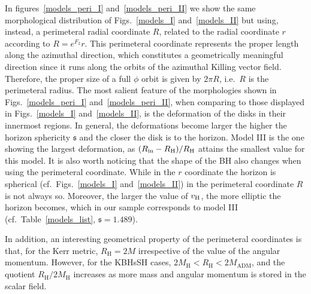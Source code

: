 \documentclass[twocolumn,aps,showpacs,showkeys,prd,superscriptaddress,byrevtex, amsmath]{revtex4-1}
\begin{document}
In figures~\ref{models_peri_I} and~\ref{models_peri_II} we show the same morphological distribution of Figs.~\ref{models_I} and~\ref{models_II} but using, instead, a perimeteral radial coordinate $R$, related to the radial coordinate $r$ according to $R = e^{F_2} r$. This perimeteral coordinate represents the proper length along the azimuthal direction, which constitutes a geometrically meaningful direction since it runs along the orbits of the azimuthal Killing vector field. Therefore, the proper size of a full $\phi$ orbit is given by $2\pi R$, i.e.~$R$ is the perimeteral radius. The most salient feature of the morphologies shown in Figs.~\ref{models_peri_I} and~\ref{models_peri_II}, when comparing to those displayed in Figs.~\ref{models_I} and~\ref{models_II}, is the deformation of the disks in their innermost regions. In general, the deformations become larger the higher the horizon sphericity $\mathfrak{s}$ and the closer the disk is to the horizon. Model III is the one showing the largest deformation, as $(R_{\rm in}-R_{\rm H})/R_{\rm H}$ attains the smallest value for this model. It is also worth noticing that the shape of the BH also changes when using the perimeteral coordinate. While in the $r$ coordinate the horizon is spherical (cf.~Figs.~\ref{models_I} and~\ref{models_II}) in the perimeteral coordinate $R$ is not always so. Moreover, the larger the value of $v_{\rm H}$, the more elliptic the horizon becomes, which in our sample corresponds to model III (cf.~Table~\ref{models_list}, $\mathfrak{s}=1.489$). 

In addition, an interesting geometrical property of the perimeteral coordinates is that, for the Kerr metric, $R_{\mathrm{H}} = 2M$ irrespective of the value of the angular momentum. However, for the KBHsSH cases, $2M_{\mathrm{H}} < R_{\mathrm{H}} < 2M_{\mathrm{ADM}}$, and the quotient $R_{\mathrm{H}}/ 2M_{\mathrm{H}}$ increases as more mass and angular momentum is stored in the scalar field.  

\end{document}
